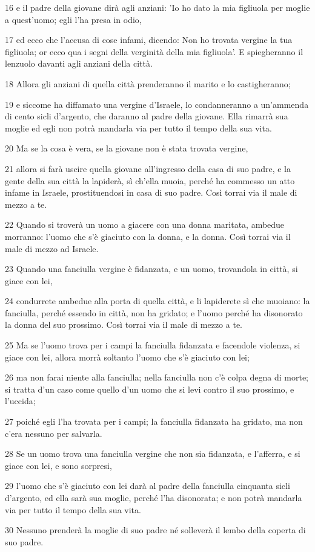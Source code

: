 \par 16 e il padre della giovane dirà agli anziani: 'Io ho dato la mia figliuola per moglie a quest'uomo; egli l'ha presa in odio,
\par 17 ed ecco che l'accusa di cose infami, dicendo: Non ho trovata vergine la tua figliuola; or ecco qua i segni della verginità della mia figliuola'. E spiegheranno il lenzuolo davanti agli anziani della città.
\par 18 Allora gli anziani di quella città prenderanno il marito e lo castigheranno;
\par 19 e siccome ha diffamato una vergine d'Israele, lo condanneranno a un'ammenda di cento sicli d'argento, che daranno al padre della giovane. Ella rimarrà sua moglie ed egli non potrà mandarla via per tutto il tempo della sua vita.
\par 20 Ma se la cosa è vera, se la giovane non è stata trovata vergine,
\par 21 allora si farà uscire quella giovane all'ingresso della casa di suo padre, e la gente della sua città la lapiderà, sì ch'ella muoia, perché ha commesso un atto infame in Israele, prostituendosi in casa di suo padre. Così torrai via il male di mezzo a te.
\par 22 Quando si troverà un uomo a giacere con una donna maritata, ambedue morranno: l'uomo che s'è giaciuto con la donna, e la donna. Così torrai via il male di mezzo ad Israele.
\par 23 Quando una fanciulla vergine è fidanzata, e un uomo, trovandola in città, si giace con lei,
\par 24 condurrete ambedue alla porta di quella città, e li lapiderete sì che muoiano: la fanciulla, perché essendo in città, non ha gridato; e l'uomo perché ha disonorato la donna del suo prossimo. Così torrai via il male di mezzo a te.
\par 25 Ma se l'uomo trova per i campi la fanciulla fidanzata e facendole violenza, si giace con lei, allora morrà soltanto l'uomo che s'è giaciuto con lei;
\par 26 ma non farai niente alla fanciulla; nella fanciulla non c'è colpa degna di morte; si tratta d'un caso come quello d'un uomo che si levi contro il suo prossimo, e l'uccida;
\par 27 poiché egli l'ha trovata per i campi; la fanciulla fidanzata ha gridato, ma non c'era nessuno per salvarla.
\par 28 Se un uomo trova una fanciulla vergine che non sia fidanzata, e l'afferra, e si giace con lei, e sono sorpresi,
\par 29 l'uomo che s'è giaciuto con lei darà al padre della fanciulla cinquanta sicli d'argento, ed ella sarà sua moglie, perché l'ha disonorata; e non potrà mandarla via per tutto il tempo della sua vita.
\par 30 Nessuno prenderà la moglie di suo padre né solleverà il lembo della coperta di suo padre.

